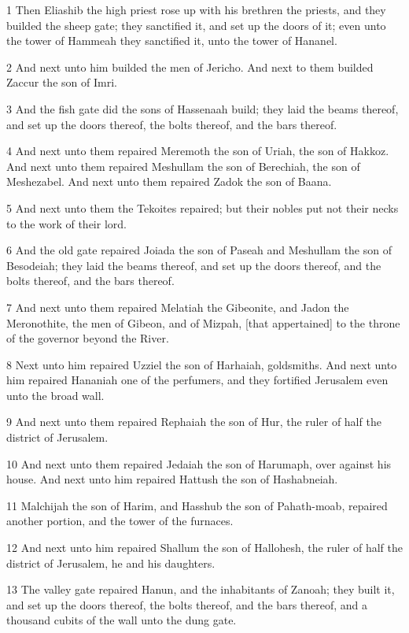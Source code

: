 \par 1 Then Eliashib the high priest rose up with his brethren the priests, and they builded the sheep gate; they sanctified it, and set up the doors of it; even unto the tower of Hammeah they sanctified it, unto the tower of Hananel.
\par 2 And next unto him builded the men of Jericho. And next to them builded Zaccur the son of Imri.
\par 3 And the fish gate did the sons of Hassenaah build; they laid the beams thereof, and set up the doors thereof, the bolts thereof, and the bars thereof.
\par 4 And next unto them repaired Meremoth the son of Uriah, the son of Hakkoz. And next unto them repaired Meshullam the son of Berechiah, the son of Meshezabel. And next unto them repaired Zadok the son of Baana.
\par 5 And next unto them the Tekoites repaired; but their nobles put not their necks to the work of their lord.
\par 6 And the old gate repaired Joiada the son of Paseah and Meshullam the son of Besodeiah; they laid the beams thereof, and set up the doors thereof, and the bolts thereof, and the bars thereof.
\par 7 And next unto them repaired Melatiah the Gibeonite, and Jadon the Meronothite, the men of Gibeon, and of Mizpah, [that appertained] to the throne of the governor beyond the River.
\par 8 Next unto him repaired Uzziel the son of Harhaiah, goldsmiths. And next unto him repaired Hananiah one of the perfumers, and they fortified Jerusalem even unto the broad wall.
\par 9 And next unto them repaired Rephaiah the son of Hur, the ruler of half the district of Jerusalem.
\par 10 And next unto them repaired Jedaiah the son of Harumaph, over against his house. And next unto him repaired Hattush the son of Hashabneiah.
\par 11 Malchijah the son of Harim, and Hasshub the son of Pahath-moab, repaired another portion, and the tower of the furnaces.
\par 12 And next unto him repaired Shallum the son of Hallohesh, the ruler of half the district of Jerusalem, he and his daughters.
\par 13 The valley gate repaired Hanun, and the inhabitants of Zanoah; they built it, and set up the doors thereof, the bolts thereof, and the bars thereof, and a thousand cubits of the wall unto the dung gate.
